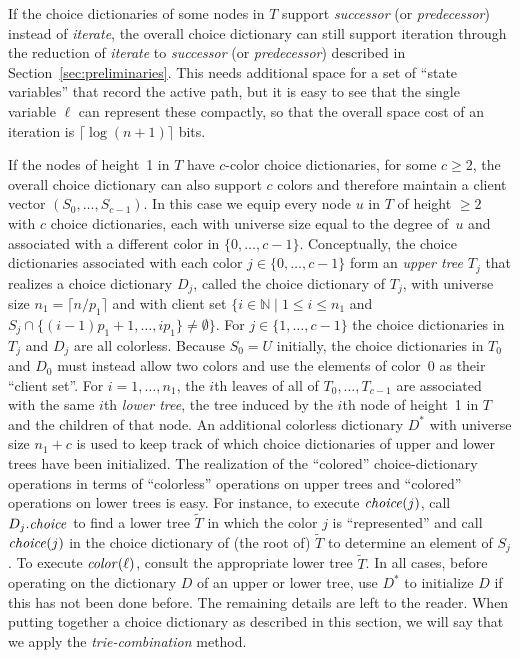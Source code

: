 \documentclass[envcountsame,envcountsect,undated,nolinenumbers]{lnthi}
\def\Tvn#1{\hbox{\textit{#1\/}}}
\def\Tceil#1{\lceil #1\rceil}
\def\TbbbN{\mathbb{N}}
\begin{document}
If the choice dictionaries of some nodes in $T$
support \Tvn{successor} (or \Tvn{predecessor})
instead of \Tvn{iterate}, the overall choice dictionary
can still support iteration through the reduction
of \Tvn{iterate} to
\Tvn{successor} (or \Tvn{predecessor})
described in Section~\ref{sec:preliminaries}.
This needs additional space for a set of
``state variables'' that record the active path,
but it is easy to see that
the single variable $\ell$ can
represent these compactly,
so that the overall space cost of an iteration
is $\Tceil{\log(n+1)}$ bits.

If the nodes of height~1 in $T$ have
$c$-color choice dictionaries, for some $c\ge 2$,
the overall choice dictionary can also support
$c$ colors and therefore maintain a client vector
$(S_0,\ldots,S_{c-1})$.
In this case we equip every node $u$ in $T$
of height $\ge 2$ with $c$
choice dictionaries, each with universe size
equal to the degree of~$u$ and associated
with a different color in $\{0,\ldots,c-1\}$.
Conceptually, the choice dictionaries
associated with each color $j\in\{0,\ldots,c-1\}$
form an \emph{upper tree} $T_j$ that realizes a 
choice dictionary $D_j$, called the
choice dictionary of $T_j$, with
universe size $n_1=\Tceil{n/{p_1}}$
and with client set
$\{i\in\TbbbN\mid 1\le i\le n_1$ and
$S_j\cap\{(i-1)p_1+1,\ldots,i p_1\}\not=\emptyset\}$.
For $j\in\{1,\ldots,c-1\}$ the choice dictionaries
in $T_j$ and $D_j$ are all colorless.
Because $S_0=U$ initially, the choice dictionaries
in $T_0$ and $D_0$ must instead allow
two colors and use the elements of color~0
as their ``client set''.
For $i=1,\ldots,n_1$,
the $i$th leaves of all of $T_0,\ldots,T_{c-1}$
are associated with the same $i$th
\emph{lower tree}, the tree induced
by the $i$th node of height~1 in $T$ and the children of that node.
An additional colorless dictionary $D^*$
with universe size $n_1+c$ is used to keep
track of which choice dictionaries of upper and lower trees
have been initialized.
The realization of the ``colored'' choice-dictionary
operations in terms of ``colorless'' operations on
upper trees and ``colored'' operations on lower
trees is easy.
For instance,
to execute $\Tvn{choice}(j)$,
call $D_j.\Tvn{choice}$ to find a lower tree $\widetilde{T}$
in which the color $j$ is ``represented'' and
call $\Tvn{choice}(j)$ in the choice dictionary
of (the root of) $\widetilde{T}$ to determine an element of $S_j$.
To execute $\Tvn{color}(\ell)$, consult the appropriate
lower tree $\widetilde{T}$.
In all cases, before operating on the
dictionary $D$ of an upper or
lower tree, use $D^*$ to initialize $D$
if this has not been done before.
The remaining details are left to the reader.
When putting together a choice dictionary as described
in this section, we will say that we apply the
\emph{trie-combination} method.
\end{document}
